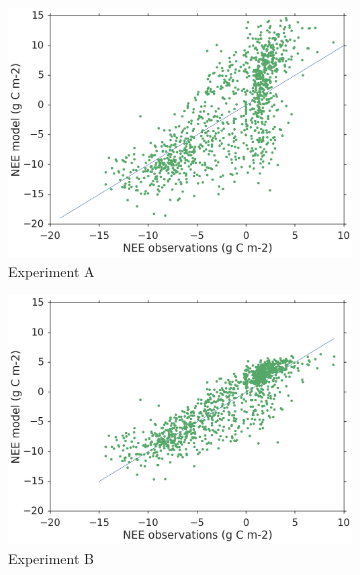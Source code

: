 \documentclass[11pt]{article}
\begin{document}
\begin{figure}
    \centering
    \begin{subfigure}[b]{0.49\textwidth}
        \includegraphics[width=\textwidth]{Afscatcvt.png}
        \caption{Experiment A}
        \label{fig:forecastscatBR}
    \end{subfigure}
    \begin{subfigure}[b]{0.49\textwidth}
        \includegraphics[width=\textwidth]{Bfscatcvt.png}
        \caption{Experiment B}
        \label{fig:forecastscatedcBR}
    \end{subfigure}
    \begin{subfigure}[b]{0.49\textwidth}

\end{subfigure}
\end{figure}
\end{document}
